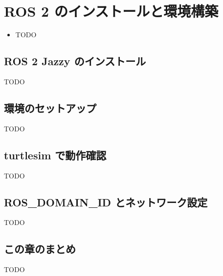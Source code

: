 \chapter{ROS 2 のインストールと環境構築}
\label{chap:ros2_install}

\begin{goalbox}
  \begin{itemize}
    \item TODO
  \end{itemize}
\end{goalbox}

\section{ROS 2 Jazzy のインストール}

TODO

\section{環境のセットアップ}

TODO

\section{turtlesim で動作確認}

TODO

\section{ROS\_DOMAIN\_ID とネットワーク設定}

TODO

\section*{この章のまとめ}

TODO
